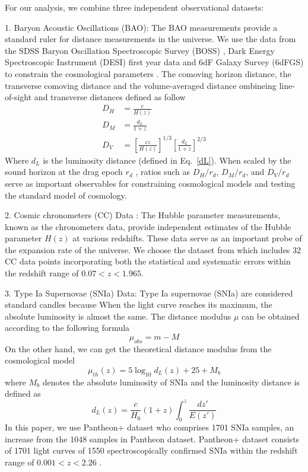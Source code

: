 \documentclass[a4paper,fleqn]{cas-sc}
\begin{document}
For our analysis, we combine three independent observational datasets:

1. Baryon Acoustic Oscillations (BAO): The BAO measurements provide a standard ruler for distance measurements in the universe. We use the data from the SDSS Baryon Oscillation Spectroscopic Survey (BOSS)  \cite{PhysRevD.103.083533}, Dark Energy Spectroscopic Instrument (DESI) first year data \cite{desicollaboration2024desi2024vicosmological} and 6dF Galaxy Survey (6dFGS) to constrain the cosmological parameters \cite{Beutler_2011}. The comoving horizon distance, the transverse comoving distance
and the volume-averaged distance ombineing line-of-sight and transverse distances defined as follow
\begin{align}
    D_H&=\frac{c}{H(z)} \\
    D_M&=\frac{d_L}{1+z}\\
    D_V&=\left[\frac{cz}{H(z)}\right]^{1/3}\left[\frac{d_L}{1+z}\right]^{2/3}
\end{align}
Where $d_L$ is the luminosity distance (defined in Eq.~\eqref{dL}). When scaled by the sound horizon at the drag epoch $r_d$ , ratios such as $D_H/r_d$, $D_M/r_d$, and $D_V/r_d$ serve as important observables for constraining cosmological models and testing the standard model of cosmology.



2. Cosmic chronometers (CC) Data : The Hubble parameter measurements, known as the chronometers data, provide independent estimates of the Hubble parameter $H(z)$ at various redshifts. These data serve as an important probe of the expansion rate of the universe. We choose the dataset from \cite{Favale_2023} which includes 32 CC data points incorporating both the statistical and systematic errors within the redshift range of $0.07 < z < 1.965$.

3. Type Ia Supernovae (SNIa) Data: Type Ia supernovae (SNIa) are considered standard candles because When the light curve reaches its maximum, the absolute luminosity is almost the same. The distance modulus $\mu$ can be obtained according to the following formula
\begin{equation}
    \mu_{obs}=m-M
\end{equation}
On the other hand, we can get the theoretical distance modulus from the cosmological model
\begin{equation}
    \mu_{th}(z)=5\log_{10}d_L(z)+25+M_b
\end{equation}
where $M_b$ denotes the absolute luminosity of SNIa and the luminosity distance is defined as
\begin{equation}
    d_L(z)=\frac{c}{H_0}(1+z)\int_0^z \frac{dz'}{E(z')}\label{dL}
\end{equation}
In this paper, we use Pantheon+ dataset who comprises 1701 SNIa samples, an increase from the 1048 samples in Pantheon dataset. Pantheon+ dataset consists of 1701 light curves of 1550 spectroscopically confirmed SNIa within the redshift range of $0.001 < z < 2.26$ \cite{Scolnic_2022,Brout_2022}.
\end{document}
